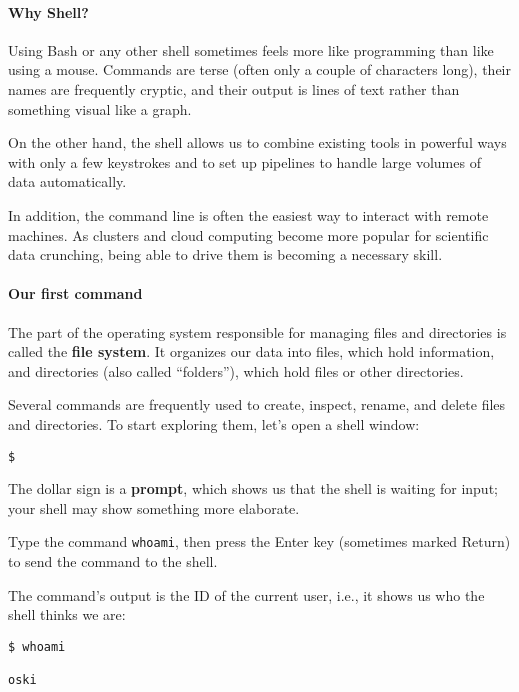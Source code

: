 \documentclass[
]{book}
\begin{document}
\hypertarget{why-shell}{%
\paragraph{Why Shell?}\label{why-shell}}

Using Bash or any other shell sometimes feels more like programming than like using a mouse. Commands are terse (often only a couple of characters long), their names are frequently cryptic, and their output is lines of text rather than something visual like a graph.

On the other hand, the shell allows us to combine existing tools in powerful ways with only a few keystrokes and to set up pipelines to handle large volumes of data automatically.

In addition, the command line is often the easiest way to interact with remote machines. As clusters and cloud computing become more popular for scientific data crunching, being able to drive them is becoming a necessary skill.

\hypertarget{our-first-command}{%
\paragraph{Our first command}\label{our-first-command}}

The part of the operating system responsible for managing files and directories is called the \textbf{file system}. It organizes our data into files, which hold information, and directories (also called ``folders''), which hold files or other directories.

Several commands are frequently used to create, inspect, rename, and delete files and directories. To start exploring them, let's open a shell window:

\begin{verbatim}
$
\end{verbatim}

The dollar sign is a \textbf{prompt}, which shows us that the shell is waiting for input; your shell may show something more elaborate.

Type the command \texttt{whoami}, then press the Enter key (sometimes marked Return) to send the command to the shell.

The command's output is the ID of the current user, i.e., it shows us who the shell thinks we are:

\begin{verbatim}
$ whoami

oski
\end{verbatim}
\end{document}
